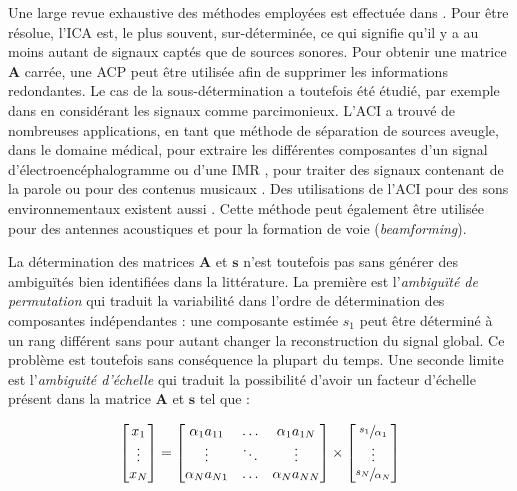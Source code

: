 Une large revue exhaustive des méthodes employées est effectuée dans \cite{hyvarinen2004independent}.
Pour être résolue, l'ICA est, le plus souvent, sur-déterminée, ce qui signifie qu'il y a au moins autant de signaux captés que de sources sonores. Pour obtenir une matrice $\mathbf{A}$ carrée, une ACP peut être utilisée afin de supprimer les informations redondantes.  Le cas de la sous-détermination a toutefois été étudié, par exemple dans \cite{bofill2000blind} en considérant les signaux comme parcimonieux.
L'ACI a trouvé de nombreuses applications, en tant que méthode de séparation de sources aveugle, dans le domaine médical, pour extraire les différentes composantes d'un signal d'électroencéphalogramme \cite{delorme2007enhanced,makeig1996independent} ou d'une IMR \cite{lee1999independent}, pour traiter des signaux contenant de la parole \cite{sarela2005denoising, hsieh2009independent} ou pour des contenus musicaux \cite{uhle2003extraction, abdallah2003independent}. Des utilisations de l'ACI pour des sons environnementaux existent aussi \cite{lombard2011tdoa, eronen2006audio}. Cette méthode peut également être utilisée pour des antennes acoustiques et pour la formation de voie (\textit{beamforming})\cite{cardoso_blind_1998,saruwatari2003blind}.

La détermination des matrices $\mathbf{A}$ et $\mathbf{s}$ n'est toutefois pas sans générer des ambiguïtés bien identifiées dans la littérature. La première est l'\textit{ambiguïté de permutation} qui traduit la variabilité dans l'ordre de détermination des composantes indépendantes : une composante estimée $s_1$ peut être déterminé à un rang différent sans pour autant changer la reconstruction du signal global.  Ce problème est toutefois sans conséquence la plupart du temps. Une seconde limite est l'\textit{ambiguité d'échelle} qui traduit la possibilité d'avoir un facteur d'échelle présent dans la matrice $\mathbf{A}$ et $\mathbf{s}$ tel que :

\begin{equation}
\begin{bmatrix}
x_{1}\\
\vdots\\
x_{N}
\end{bmatrix} =
\begin{bmatrix}
\alpha_1 a_{11} & \dots & \alpha_1 a_{1N}\\
\vdots & \ddots & \vdots\\
\alpha_N a_{N1} & \dots & \alpha_N a_{NN}
\end{bmatrix}
\times
\begin{bmatrix}
\sfrac{s_{1}}{\alpha_1}\\
\vdots\\
\sfrac{s_{N}}{\alpha_N}
\end{bmatrix}
\end{equation}

